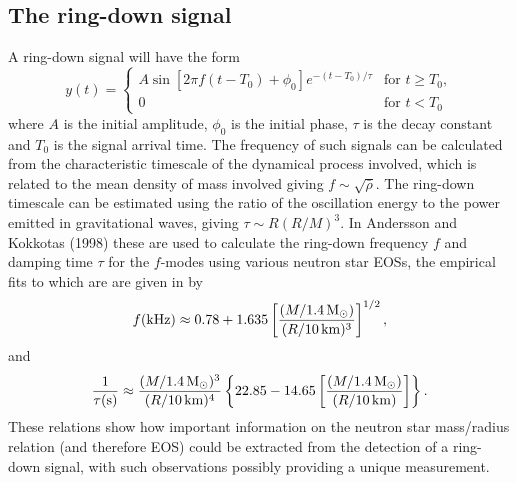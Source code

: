 \subsection{The ring-down signal}\label{sec:ringdownsignal}
A ring-down signal will have the form
\begin{equation}\label{Ringdown}
y(t) =  \left\{ \begin{array}{ll}
A\sin{[2\pi{}f(t-T_0) + \phi_0]}e^{-(t-T_0)/\tau} & \mbox{for $t \ge T_0$}, \\
0 & \mbox{for $t < T_0$}
\end{array}
\right. 
\end{equation}
where $A$ is the initial amplitude, $\phi_0$ is the initial phase, $\tau$ is the decay constant and
$T_0$ is the signal arrival time. The frequency of such signals can be calculated from the
characteristic timescale of the dynamical process involved, which is related to the mean density of
mass involved giving $f \sim \sqrt{\bar{\rho}}$. The ring-down timescale can be estimated using the
ratio of the oscillation energy to the power emitted in gravitational waves, giving $\tau \sim
R(R/M)^3$. In Andersson and Kokkotas (1998) \cite{AnderssonKokkotas:1998} these are used to
calculate the ring-down frequency $f$ and damping time $\tau$ for the $f$-modes using various
neutron star EOSs, the empirical fits to which are are given in \cite{AnderssonKokkotas:1998} by
\begin{equation}
f({\rm kHz}) \approx 0.78 + 1.635\left[\frac{(M/1.4\,{\rm M}_{\odot})}{(R/10\,{\rm
km})^3}\right]^{1/2},
\end{equation}
and
\begin{equation}
\frac{1}{\tau(\rm{s})} \approx \frac{(M/1.4\,{\rm M}_{\odot})^3}{(R/10\,{\rm km})^4}\left\{22.85 -
14.65\left[\frac{(M/1.4\,{\rm M}_{\odot})}{(R/10\,{\rm km})}\right]\right\}.
\end{equation}
These relations show how important information on the neutron star mass/radius relation (and
therefore EOS) could be extracted from the detection of a ring-down signal, with such
observations possibly providing a unique measurement.


